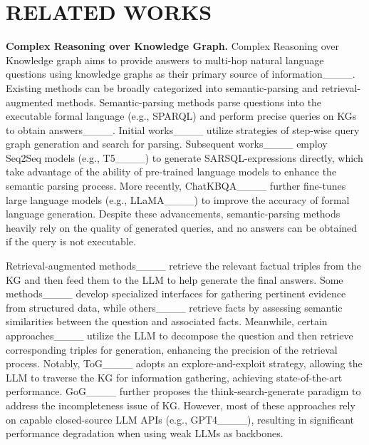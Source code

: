 \section{RELATED WORKS}
\noindent \textbf{Complex Reasoning over Knowledge Graph.} Complex Reasoning over Knowledge graph aims to provide answers to multi-hop natural language questions using knowledge graphs as their primary source of information____. Existing methods can be broadly categorized into semantic-parsing and retrieval-augmented methods. Semantic-parsing methods parse questions into the executable formal language (e.g., SPARQL) and perform precise queries on KGs to obtain answers____. Initial works____ utilize strategies of step-wise query graph generation and search for parsing. Subsequent works____ employ Seq2Seq models (e.g., T5____) to generate SARSQL-expressions directly, which take advantage of the ability of pre-trained language models to enhance the semantic parsing process. More recently, ChatKBQA____ further fine-tunes large language models (e.g., LLaMA____) to improve the accuracy of formal language generation. Despite these advancements, semantic-parsing methods heavily rely on the quality of generated queries, and no answers can be obtained if the query is not executable.

Retrieval-augmented methods____ retrieve the relevant factual triples from the KG and then feed them to the LLM to help generate the final answers. Some methods____ develop specialized interfaces for gathering pertinent evidence from structured data, while others____ retrieve facts by assessing semantic similarities between the question and associated facts. Meanwhile, certain approaches____ utilize the LLM to decompose the question and then retrieve corresponding triples for generation, enhancing the precision of the retrieval process. Notably, ToG____ adopts an explore-and-exploit strategy, allowing the LLM to traverse the KG for information gathering, achieving state-of-the-art performance. GoG____ further proposes the think-search-generate paradigm to address the incompleteness issue of KG. However, most of these approaches rely on capable closed-source LLM APIs (e.g., GPT4____), resulting in significant performance degradation when using weak LLMs as backbones. 



